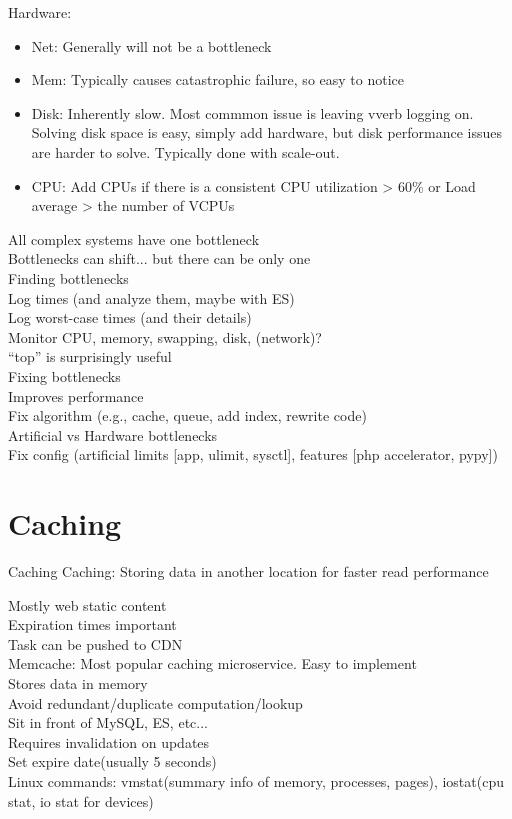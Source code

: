 \documentclass[fancy,11pt,titlestyle=display]{style/elegantbook}
\begin{document}
\noindent Hardware:
\begin{itemize}
    \item Net: Generally will not be a bottleneck
    \item Mem: Typically causes catastrophic failure, so easy to notice
    \item Disk: Inherently slow. Most commmon issue is leaving vverb logging on. Solving disk space is easy, simply add hardware, but disk performance issues are harder to solve. Typically done with scale-out.
    \item CPU: Add CPUs if there is a consistent CPU utilization > 60\% or Load average > the number of VCPUs
\end{itemize}
All complex systems have one bottleneck\\
Bottlenecks can shift... but there can be only one\\

Finding bottlenecks\\
Log times (and analyze them, maybe with ES)\\
Log worst-case times (and their details)\\
Monitor CPU, memory, swapping, disk, (network)?\\
``top'' is surprisingly useful\\

Fixing bottlenecks\\
Improves performance\\
Fix algorithm (e.g., cache, queue, add index, rewrite code)\\
Artificial vs Hardware bottlenecks\\
Fix config (artificial limits [app, ulimit, sysctl], features [php accelerator, pypy])\\


\section{Caching}

\begin{definition}{Caching}{}
Caching: Storing data in another location for faster read performance
\end{definition}

Mostly web static content\\
Expiration times important\\
Task can be pushed to CDN\\

Memcache: Most popular caching microservice. 
Easy to implement\\
Stores data in memory\\
Avoid redundant/duplicate computation/lookup\\
Sit in front of MySQL, ES, etc...\\
Requires invalidation on updates\\
Set expire date(usually 5 seconds)\\
Linux commands: vmstat(summary info of memory, processes, pages), iostat(cpu stat, io stat for devices)
\end{document}

